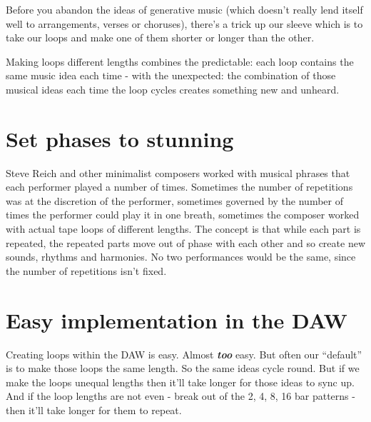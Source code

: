 \documentclass[
  12pt,
  letterpaper,
  oneside,
  open=any]{scrbook}
\begin{document}
Before you abandon the ideas of generative music (which doesn't really
lend itself well to arrangements, verses or choruses), there's a trick
up our sleeve which is to take our loops and make one of them shorter or
longer than the other.

\begin{tcolorbox}[enhanced jigsaw, titlerule=0mm, toprule=.15mm, bottomrule=.15mm, colframe=quarto-callout-tip-color-frame, bottomtitle=1mm, opacityback=0, breakable, leftrule=.75mm, coltitle=black, colback=white, rightrule=.15mm, arc=.35mm, toptitle=1mm, title=\textcolor{quarto-callout-tip-color}{\faLightbulb}\hspace{0.5em}{Key idea}, opacitybacktitle=0.6, left=2mm, colbacktitle=quarto-callout-tip-color!10!white]

Making loops different lengths combines the predictable: each loop
contains the same music idea each time - with the unexpected: the
combination of those musical ideas each time the loop cycles creates
something new and unheard.

\end{tcolorbox}

\section{Set phases to stunning}\label{set-phases-to-stunning}

Steve Reich and other minimalist composers worked with musical phrases
that each performer played a number of times. Sometimes the number of
repetitions was at the discretion of the performer, sometimes governed
by the number of times the performer could play it in one breath,
sometimes the composer worked with actual tape loops of different
lengths. The concept is that while each part is repeated, the repeated
parts move out of phase with each other and so create new sounds,
rhythms and harmonies. No two performances would be the same, since the
number of repetitions isn't fixed.

\section{Easy implementation in the
DAW}\label{easy-implementation-in-the-daw}

Creating loops within the DAW is easy. Almost \textbf{\emph{too}} easy.
But often our ``default'' is to make those loops the same length. So the
same ideas cycle round. But if we make the loops unequal lengths then
it'll take longer for those ideas to sync up. And if the loop lengths
are not even - break out of the 2, 4, 8, 16 bar patterns - then it'll
take longer for them to repeat.
\end{document}
